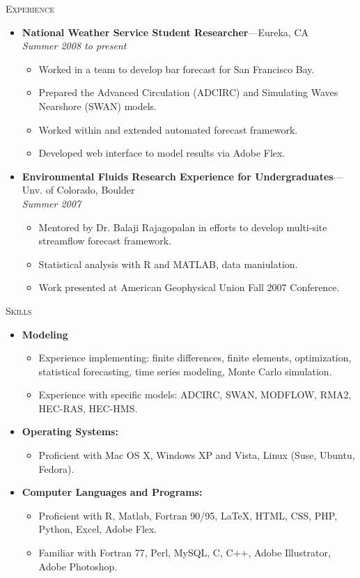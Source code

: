 \documentclass[11pt,oneside]{article}
\newenvironment{ressection}[1]{
	\vspace{3pt}
	{\Large#1}
	\begin{itemize}
	\vspace{2pt}
}{
	\end{itemize}
}
\newcommand{\resitem}[1]{
	\vspace{-4pt}
	\item \begin{flushleft} #1 \end{flushleft}
}
\newcommand{\ressubitem}[1]{
	\vspace{-1pt}
	\item \begin{flushleft} #1 \end{flushleft}
}
\newcommand{\resbigitem}[3]{
	\vspace{-5pt}
	\item
	\textbf{#1}---#2 \\
	\textit{#3}
}
\newenvironment{ressubsec}[3]{
	\resbigitem{#1}{#2}{#3}
	\vspace{-2pt}
	\begin{itemize}
}{
	\end{itemize}
}
\newenvironment{reslist}[1]{
	\resitem{\textbf{#1}}
	\vspace{-5pt}
	\begin{itemize}
}{
	\end{itemize}
}
\begin{document}
\begin{ressection}{\scshape Experience}

	\begin{ressubsec}{National Weather Service Student Researcher}{Eureka, CA}{Summer 2008 to present}
		\ressubitem{Worked in a team to develop bar forecast for San Francisco Bay.}
		\ressubitem{Prepared the Advanced Circulation (ADCIRC) and Simulating Waves Nearshore (SWAN) models.}
		\ressubitem{Worked within and extended automated forecast framework.}
		\ressubitem{Developed web interface to model results via Adobe Flex.}
	\end{ressubsec}

	\begin{ressubsec}{Environmental Fluids Research Experience for Undergraduates}{Unv. of Colorado, Boulder}{Summer 2007}
		\ressubitem{Mentored by Dr. Balaji Rajagopalan in efforts to develop multi-site streamflow forecast framework.}
		\ressubitem{Statistical analysis with R and MATLAB, data maniulation.}
		\ressubitem{Work presented at American Geophysical Union Fall 2007 Conference.}
	\end{ressubsec}

\end{ressection}


\begin{ressection}{\scshape Skills}
    
    \begin{reslist}{Modeling}
      \resitem{Experience implementing: finite differences, finite elements, optimization, statistical forecasting, time series modeling, Monte Carlo simulation.}
      \resitem{Experience with specific models: ADCIRC, SWAN, MODFLOW, RMA2, HEC-RAS, HEC-HMS.}
    \end{reslist}

	\begin{reslist}{Operating Systems:}
		\resitem{Proficient with Mac OS X, Windows XP and Vista, Linux (Suse, Ubuntu, Fedora).}
    \end{reslist}

	\begin{reslist}{Computer Languages and Programs:}

		\resitem{Proficient with R, Matlab, Fortran 90/95, \LaTeX, HTML, CSS, PHP, Python, Excel, Adobe Flex.}
		\resitem{Familiar with Fortran 77, Perl, MySQL, C, C++, Adobe Illustrator, Adobe Photoshop.}

	\end{reslist}



\end{ressection}
\end{document}
